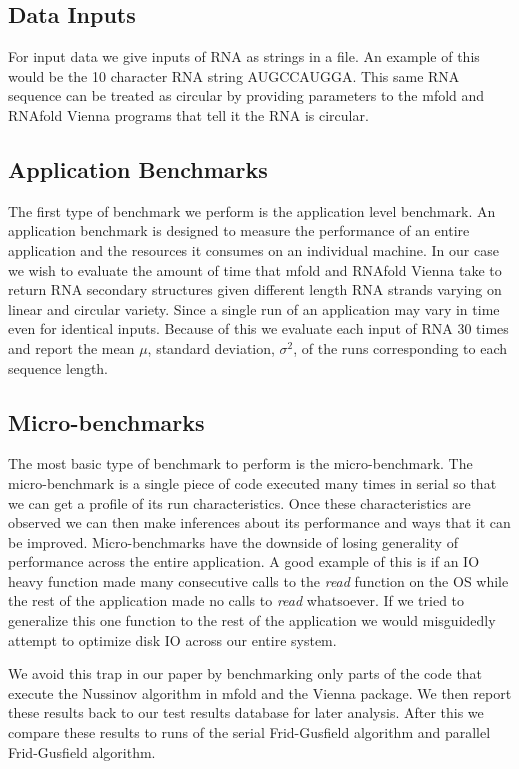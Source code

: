 \documentclass[12pt]{article}
\begin{document}
\subsection{Data Inputs}
\par For input data we give inputs of RNA as strings in a file. An example of this
would be the 10 character RNA string AUGCCAUGGA. This same RNA sequence can be
treated as circular by providing parameters to the mfold and RNAfold Vienna
programs that tell it the RNA is circular\cite{mfold-manual, vienna-manual}.
\subsection{Application Benchmarks}
\par The first type of benchmark we perform is the application level benchmark.
An application benchmark is designed to measure the performance of an entire
application and the resources it consumes on an individual machine\cite{jain}.
In our case we wish to evaluate the amount of time that mfold and RNAfold Vienna
take to return RNA secondary structures given different length RNA strands varying
on linear and circular variety. Since a single run of an application may vary in
time even for identical inputs. Because of this we evaluate each input of RNA 30
times and report the mean $\mu$, standard deviation, $\sigma^2$, of the runs
corresponding to each sequence length.

\subsection{Micro-benchmarks}
\par The most basic type of benchmark to perform is the micro-benchmark. The
micro-benchmark is a single piece of code executed many times in serial so that
we can get a profile of its run characteristics\cite{eulogy,sysperformance}.
Once these characteristics are observed we can then make inferences about its
performance and ways that it can be improved. Micro-benchmarks have the downside
of losing generality of performance across the entire application\cite{eulogy, sysperformance}.
A good example of this is if an IO heavy function made many consecutive calls to
the \textit{read} function on the OS while the rest of the application made no
calls to \textit{read} whatsoever. If we tried to generalize this one function to
the rest of the application we would misguidedly attempt to optimize disk IO
across our entire system.
\par We avoid this trap in our paper by benchmarking only parts of the code that
execute the Nussinov algorithm in mfold and the Vienna package. We then report
these results back to our test results database for later analysis. After this we
compare these results to runs of the serial Frid-Gusfield algorithm and parallel
Frid-Gusfield algorithm.
\end{document}
